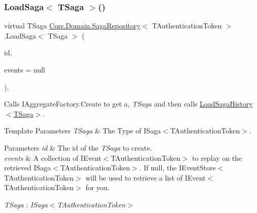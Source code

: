 \subsubsection{\texorpdfstring{Load\+Saga$<$ T\+Saga $>$()}{LoadSaga< TSaga >()}}
{\footnotesize\ttfamily virtual T\+Saga \hyperlink{classCqrs_1_1Domain_1_1SagaRepository}{Cqrs.\+Domain.\+Saga\+Repository}$<$ T\+Authentication\+Token $>$.Load\+Saga$<$ T\+Saga $>$ (\begin{DoxyParamCaption}\item[{Guid}]{id,  }\item[{I\+List$<$ \hyperlink{interfaceCqrs_1_1Events_1_1ISagaEvent}{I\+Saga\+Event}$<$ T\+Authentication\+Token $>$$>$}]{events = {\ttfamily null} }\end{DoxyParamCaption})\hspace{0.3cm}{\ttfamily [protected]}, {\ttfamily [virtual]}}



Calls I\+Aggregate\+Factory.\+Create to get a, {\itshape T\+Saga}  and then calls \hyperlink{classCqrs_1_1Domain_1_1SagaRepository_af6af9066681e47bc4ff2e14358321fb8_af6af9066681e47bc4ff2e14358321fb8}{Load\+Saga\+History$<$\+T\+Saga$>$}. 


\begin{DoxyTemplParams}{Template Parameters}
{\em T\+Saga} & The Type of I\+Saga$<$\+T\+Authentication\+Token$>$.\\
\hline
\end{DoxyTemplParams}

\begin{DoxyParams}{Parameters}
{\em id} & The id of the {\itshape T\+Saga}  to create.\\
\hline
{\em events} & A collection of I\+Event$<$\+T\+Authentication\+Token$>$ to replay on the retrieved I\+Saga$<$\+T\+Authentication\+Token$>$. If null, the I\+Event\+Store$<$\+T\+Authentication\+Token$>$ will be used to retrieve a list of I\+Event$<$\+T\+Authentication\+Token$>$ for you. \\
\hline
\end{DoxyParams}
\begin{Desc}
\item[Type Constraints]\begin{description}
\item[{\em T\+Saga} : {\em I\+Saga$<$T\+Authentication\+Token$>$}]\end{description}
\end{Desc}
\mbox{\label{classCqrs_1_1Domain_1_1SagaRepository_af6af9066681e47bc4ff2e14358321fb8_af6af9066681e47bc4ff2e14358321fb8}} 

